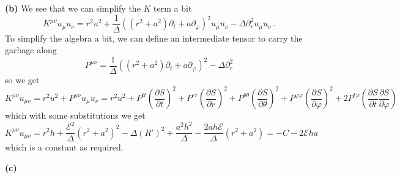 \documentclass[10pt]{article}
\newcommand{\di}[2][]{\frac{\partial #1}{\partial #2}}
\begin{document}
\textbf{(b)}  We see that we can simplify the $K$ term a bit
\[ K^{\mu\nu}u_{\mu}u_{\nu} = r^{2}u^{2} + \frac{1}{\Delta}\left((r^{2} + a^{2})\partial_{t} + a\partial_{\varphi}\right)^{2}u_{\mu}u_{\nu} - \Delta\partial_{r}^{2}u_{\mu}u_{\nu}\, . \]
To simplify the algebra a bit, we can define an intermediate tensor to carry the garbage along
\[ P^{\mu\nu}=  \frac{1}{\Delta}\left((r^{2} + a^{2})\partial_{t} + a\partial_{\varphi}\right)^{2} - \Delta\partial_{r}^{2} \]
so we get
\[ K^{\mu\nu}u_{\mu\nu} = r^{2}u^{2} + P^{\mu\nu}u_{\mu}u_{\nu} = r^{2}u^{2} + P^{tt}\left(\di[S]{t}\right)^{2} + P^{rr}\left(\di[S]{r}\right)^{2} + P^{\theta\theta}\left(\di[S]{\theta}\right)^{2} + P^{\varphi\varphi}\left(\di[S]{\varphi}\right)^{2} +2P^{t\varphi}\left(\di[S]{t}\di[S]{\varphi}\right)\]
which with some substitutions we get
\[ K^{\mu\nu}u_{\mu\nu} = r^{2}h + \frac{\mathcal{E}^{2}}{\Delta}(r^{2} + a^{2})^{2} - \Delta(R')^{2} + \frac{a^{2}h^{2}}{\Delta} - \frac{2ah\mathcal{E}}{\Delta}\left(r^{2} + a^{2}\right) = -C - 2\mathcal{E}ha\]
which is a constant as required.

\textbf{(c)}
\end{document}
